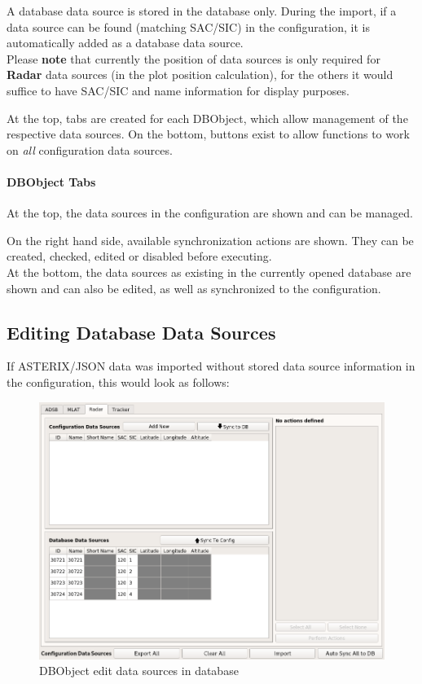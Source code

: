 A database data source is stored in the database only. During the import, if a data source can be found (matching SAC/SIC) in the configuration, it is automatically added as a database data source. \\

Please \textbf{note} that currently the position of data sources is only required for \textbf{Radar} data sources (in the plot position calculation), for the others it would suffice to have SAC/SIC and name information for display purposes.

At the top, tabs are created for each DBObject, which allow management of the respective data sources. On the bottom, buttons exist to allow functions to work on \textit{all} configuration data sources.

\paragraph {DBObject Tabs}

At the top, the data sources in the configuration are shown and can be managed. 

On the right hand side, available synchronization actions are shown. They can be created, checked, edited or disabled before executing. \\

At the bottom, the data sources as existing in the currently opened database are shown and can also be edited, as well as synchronized to the configuration. \\


\subsection{Editing Database Data Sources}

If ASTERIX/JSON data was imported without stored data source information in the configuration, this would look as follows:

\begin{figure}[H]
  \center
    \includegraphics[width=16cm,frame]{../screenshots/manage_data_sources_edit_ds_db.png}
  \caption{DBObject edit data sources in database}
\end{figure}

